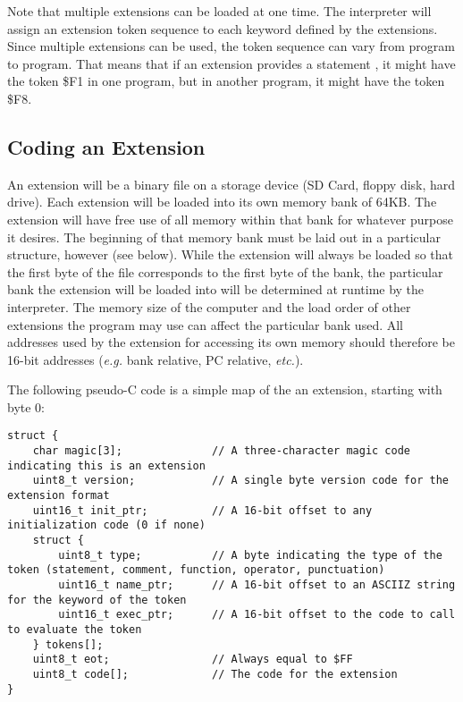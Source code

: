 \documentclass{report}
\begin{document}
    Note that multiple extensions can be loaded at one time. The interpreter will assign an extension
    token sequence to each keyword defined by the extensions. Since multiple extensions can be used,
    the token sequence can vary from program to program. That means that if an extension provides a
    statement , it might have the token \$F1 in one program, but in another program, it
    might have the token \$F8.

    \subsection*{Coding an Extension}
    
    An extension will be a binary file on a storage device (SD Card, floppy disk, hard drive). Each
    extension will be loaded into its own memory bank of 64KB. The extension will have free use of all
    memory within that bank for whatever purpose it desires. The beginning of that memory bank must be
    laid out in a particular structure, however (see below). While the extension will always be loaded so
    that the first byte of the file corresponds to the first byte of the bank, the particular bank the
    extension will be loaded into will be determined at runtime by the interpreter. The memory size of
    the computer and the load order of other extensions the program may use can affect the particular
    bank used. All addresses used by the extension for accessing its own memory should therefore be
    16-bit addresses ({\it e.g.} bank relative, PC relative, {\it etc.}).

    The following pseudo-C code is a simple map of the an extension, starting with byte 0:

    \begin{verbatim}
struct {
    char magic[3];              // A three-character magic code indicating this is an extension
    uint8_t version;            // A single byte version code for the extension format
    uint16_t init_ptr;          // A 16-bit offset to any initialization code (0 if none)
    struct {
        uint8_t type;           // A byte indicating the type of the token (statement, comment, function, operator, punctuation)
        uint16_t name_ptr;      // A 16-bit offset to an ASCIIZ string for the keyword of the token
        uint16_t exec_ptr;      // A 16-bit offset to the code to call to evaluate the token
    } tokens[];
    uint8_t eot;                // Always equal to $FF
    uint8_t code[];             // The code for the extension
}
    \end{verbatim}
\end{document}
